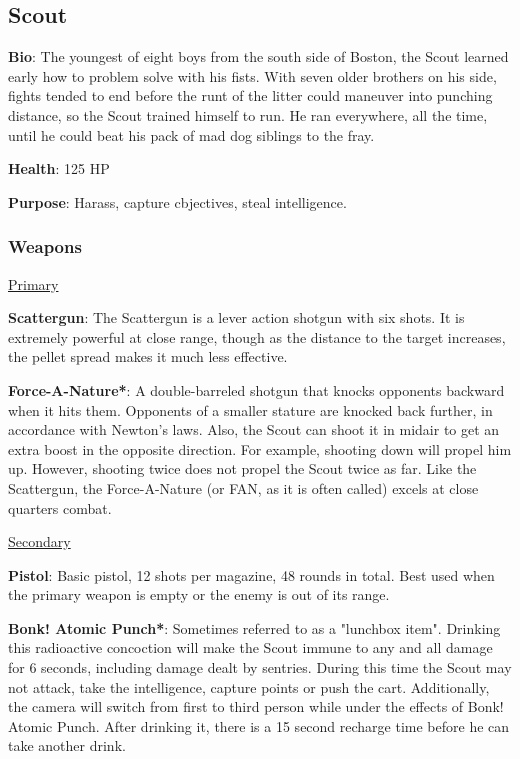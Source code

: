 \subsection{Scout}
{\bf Bio}:
The youngest of eight boys from the south side of Boston, the Scout learned early how to problem solve with his fists. With seven older brothers on his side, fights tended to end before the runt of the litter could maneuver into punching distance, so the Scout trained himself to run. He ran everywhere, all the time, until he could beat his pack of mad dog siblings to the fray.

{\bf Health}: 125 HP

{\bf Purpose}:
Harass, capture cbjectives, steal intelligence.

\subsubsection {Weapons}

\begin {center}
\underline {Primary}
\end {center}

{\bf Scattergun}:  The Scattergun is a lever action shotgun with six shots. It is extremely powerful at close range, though as the distance to the target increases, the pellet spread makes it much less effective.

{\bf Force-A-Nature*}: A double-barreled shotgun that knocks opponents backward when it hits them.  Opponents of a smaller stature are knocked back further, in accordance with Newton's laws.  Also, the Scout can shoot it in midair to get an extra boost in the opposite direction.  For example, shooting down will propel him up. However, shooting twice does not propel the Scout twice as far. Like the Scattergun, the Force-A-Nature (or FAN, as it is often called) excels at close quarters combat.


\begin {center}
\underline {Secondary}
\end {center}

{\bf Pistol}: Basic pistol, 12 shots per magazine, 48 rounds in total. Best used when the primary weapon is empty or the enemy is out of its range.

{\bf Bonk! Atomic Punch*}: Sometimes referred to as a "lunchbox item". Drinking this radioactive concoction will make the Scout immune to any and all damage for 6 seconds, including damage dealt by sentries. During this time the Scout may not attack, take the intelligence, capture points or push the cart. Additionally, the camera will switch from first to third person while under the effects of Bonk! Atomic Punch. After drinking it, there is a 15 second recharge time before he can take another drink.

